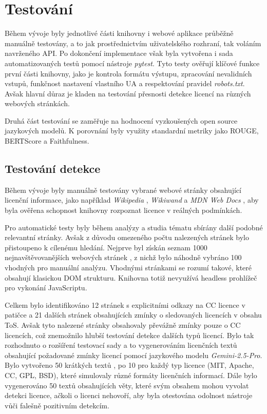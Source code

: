 \chapter{Testování}
\begin{chapterabstract}
    Během vývoje byly jednotlivé části knihovny i webové aplikace průběžně manuálně testovány, a to jak prostřednictvím uživatelského rozhraní, tak voláním navrženého API.
    Po dokončení implementace však byla vytvořena i sada automatizovaných testů pomocí nástroje \textit{pytest}.
    Tyto testy ověřují klíčové funkce první části knihovny, jako je kontrola formátu výstupu, zpracování nevalidních vstupů, funkčnost nastavení vlastního UA a respektování pravidel \textit{robots.txt}.
    Avšak hlavní důraz je kladen na testování přesnosti detekce licencí na různých webových stránkách.
    
    Druhá část testování se zaměřuje na hodnocení vyzkoušených open source jazykových modelů.
    K porovnání byly využity standardní metriky jako ROUGE, BERTScore a Faithfulness.
\end{chapterabstract}

\section{Testování detekce}
Během vývoje byly manuálně testovány vybrané webové stránky obsahující licenční informace, jako například \textit{Wikipedia} \cite{wikipediaWikipediaFree}, \textit{Wikiwand} \cite{wikiwandWikiwandWikipedia} a \textit{MDN Web Docs} \cite{mozillaDocs}, aby byla ověřena schopnost knihovny rozpoznat licence v reálných podmínkách.

Pro automatické testy byly během analýzy a studia tématu sbírány další podobné relevantní stránky.
Avšak z důvodu omezeného počtu nalezených stránek bylo přistoupeno k cílenému hledání.
Nejprve byl získán seznam 1000 nejnavštěvovanějších webových stránek \cite{dataforseo1000Websites}, z nichž bylo náhodně vybráno 100 vhodných pro manuální analýzu.
Vhodnými stránkami se rozumí takové, které obsahují klasickou DOM strukturu.
Knihovna totiž nevyužívá headless prohlížeč pro vykonání JavaScriptu.

Celkem bylo identifikováno 12 stránek s explicitními odkazy na CC licence v patičce a 21 dalších stránek obsahujících zmínky o sledovaných licencích v obsahu ToS.
Avšak tyto nalezené stránky obsahovaly převážně zmínky pouze o CC licencích, což znemožnilo hlubší testování detekce dalších typů licencí.
Bylo tak rozhodnuto o rozšíření testovací sady a to vygenerováním licenčních textů obsahující požadované zmínky licencí pomocí jazykového modelu \textit{Gemini-2.5-Pro}.
Bylo vytvořeno 50 krátkých textů \cite{googleGemini}, po 10 pro každý typ licence (MIT, Apache, CC, GPL, BSD), které simulovaly různé formáty licenčních informací.
Dále bylo vygenerováno 50 textů \cite{googleGemini2} obsahujících věty, které svým obsahem mohou vyvolat detekci licence, ačkoli o licenci nehovoří, aby byla otestována odolnost nástroje vůči falešně pozitivním detekcím.

